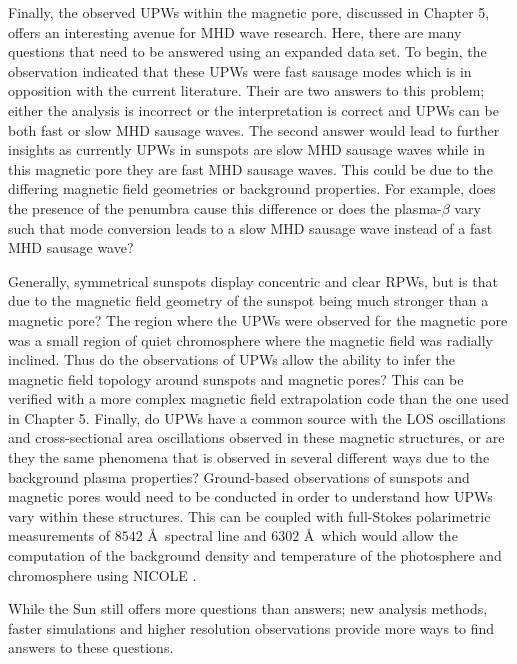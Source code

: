 	Finally, the observed UPWs within the magnetic pore, discussed in Chapter 5, offers an interesting avenue for MHD wave research.
	Here, there are many questions that need to be answered using an expanded data set.
	To begin, the observation indicated that these UPWs were fast sausage modes which is in opposition with the current literature.
	Their are two answers to this problem; either the analysis is incorrect or the interpretation is correct and UPWs can be both fast or slow MHD sausage waves.
	The second answer would lead to further insights as currently UPWs in sunspots are slow MHD sausage waves while in this magnetic pore they are fast MHD sausage waves.
	This could be due to the differing magnetic field geometries or background properties.
	For example, does the presence of the penumbra cause this difference or does the plasma-$\beta$ vary such that mode conversion leads to a slow MHD sausage wave instead of a fast MHD sausage wave?
	
	Generally, symmetrical sunspots display concentric and clear RPWs, but is that due to the magnetic field geometry of the sunspot being much stronger than a magnetic pore?
	The region where the UPWs were observed for the magnetic pore was a small region of quiet chromosphere where the magnetic field was radially inclined.
	Thus do the observations of UPWs allow the ability to infer the magnetic field topology around sunspots and magnetic pores?
	This can be verified with a more complex magnetic field extrapolation code than the one used in Chapter 5.
	Finally, do UPWs have a common source with the LOS oscillations and cross-sectional area oscillations observed in these magnetic structures, or are they the same phenomena that is observed in several different ways due to the background plasma properties?
	Ground-based observations of sunspots and magnetic pores would need to be conducted in order to understand how UPWs vary within these structures.
	This can be coupled with full-Stokes polarimetric measurements of  $8542$ \AA\ spectral line and  $6302$ \AA\ which would allow the computation of the background density and temperature of the photosphere and chromosphere using NICOLE \citep{2015A&A...577A...7S,2015ApJ...798..100B}.
	
	While the Sun still offers more questions than answers; new analysis methods, faster simulations and higher resolution observations provide more ways to find answers to these questions.